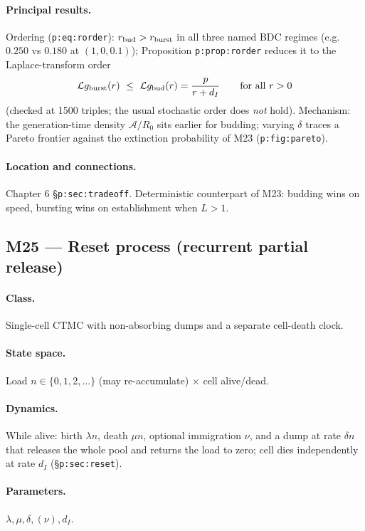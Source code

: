 \documentclass[11pt,a4paper]{article}
\newcommand{\Lap}{\mathcal{L}}      %
\begin{document}
\paragraph{Principal results.} Ordering (\texttt{p:eq:rorder}):
$r_{\rm bud}>r_{\rm burst}$ in all three named BDC regimes (e.g.\ $0.250$
vs $0.180$ at $(1,0,0.1)$); Proposition \texttt{p:prop:rorder} reduces it
to the Laplace-transform order
\[
\Lap g_{\rm burst}(r)\ \le\ \Lap g_{\rm bud}(r)=\frac{p}{r+d_I}
\qquad\text{for all } r>0
\]
(checked at 1500 triples; the usual stochastic order does \emph{not}
hold). Mechanism: the generation-time density $\mathcal A/R_0$ sits earlier
for budding; varying $\delta$ traces a Pareto frontier against the
extinction probability of M23 (\texttt{p:fig:pareto}).

\paragraph{Location and connections.} Chapter 6
\S\texttt{p:sec:tradeoff}. Deterministic counterpart of M23: budding wins
on speed, bursting wins on establishment when $L>1$.

\subsection{M25 --- Reset process (recurrent partial release)}

\paragraph{Class.} Single-cell CTMC with non-absorbing dumps and a separate
cell-death clock.

\paragraph{State space.} Load $n\in\{0,1,2,\ldots\}$ (may re-accumulate)
$\times$ cell alive/dead.

\paragraph{Dynamics.} While alive: birth $\lambda n$, death $\mu n$,
optional immigration $\nu$, and a dump at rate $\delta n$ that releases the
whole pool and returns the load to zero; cell dies independently at rate
$d_I$ (\S\texttt{p:sec:reset}).

\paragraph{Parameters.} $\lambda,\mu,\delta,(\nu),d_I$.
\end{document}
